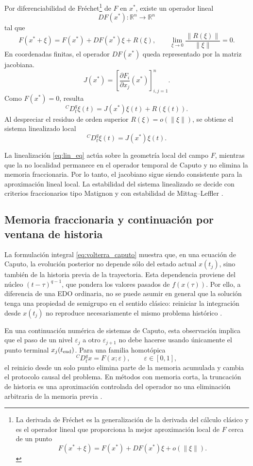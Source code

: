 \documentclass[journal]{IEEEtran}
\begin{document}
Por diferenciabilidad de Fréchet\footnote{La derivada de Fréchet es la generalización de la derivada del cálculo clásico y es el operador lineal que proporciona la mejor aproximación local de \(F\) cerca de un punto \cite{Deimling1985,Khalil2002}
\[
F(x^\ast+\xi)=F(x^\ast)+DF(x^\ast)\xi+o(\|\xi\|).
\]
} de \(F\) en \(x^\ast\), existe un operador lineal
\[
DF(x^\ast):\mathbb R^n\to\mathbb R^n
\]
tal que
\[
F(x^\ast+\xi)
=
F(x^\ast)+DF(x^\ast)\xi+R(\xi),
\qquad
\lim_{\xi\to0}\frac{\|R(\xi)\|}{\|\xi\|}=0. 
\]
En coordenadas finitas, el operador \(DF(x^\ast)\) queda representado por la matriz jacobiana.
\[
J(x^\ast)=
\left[
\frac{\partial F_i}{\partial x_j}(x^\ast)
\right]_{i,j=1}^{n}.
\]
Como \(F(x^\ast)=0\), resulta
\[
{}^{C}D_t^q \xi(t)
=
J(x^\ast)\xi(t)+R(\xi(t)).
\]
Al despreciar el residuo de orden superior \(R(\xi)=o(\|\xi\|)\), se obtiene el sistema linealizado local
\begin{equation}
\label{eq:lin_eq}
{}^{C}D_t^q \xi(t)=J(x^\ast)\xi(t).
\end{equation}

La linealización \eqref{eq:lin_eq} actúa sobre la geometría local del campo \(F\), mientras que la no localidad permanece en el operador temporal de Caputo y no elimina la memoria fraccionaria. Por lo tanto, el jacobiano sigue siendo consistente para la aproximación lineal local. La estabilidad del sistema linealizado se decide con criterios fraccionarios tipo Matignon y con estabilidad de Mittag--Leffler \cite{Matignon1996,LiMa2013,LiChenPodlubny2009}.

\subsection{Memoria fraccionaria y continuación por ventana de historia}

La formulación integral \eqref{eq:volterra_caputo} muestra que, en una ecuación de Caputo, la evolución posterior no depende sólo del estado actual \(x(t_j)\), sino también de la historia previa de la trayectoria. Esta dependencia proviene del núcleo \((t-\tau)^{q-1}\), que pondera los valores pasados de \(f(x(\tau))\). Por ello, a diferencia de una EDO ordinaria, no se puede asumir en general que la solución tenga una propiedad de semigrupo en el sentido clásico: reiniciar la integración desde \(x(t_j)\) no reproduce necesariamente el mismo problema histórico \cite{LiMa2013}.

En una continuación numérica de sistemas de Caputo, esta observación implica que el paso de un nivel \(\varepsilon_j\) a otro \(\varepsilon_{j+1}\) no debe hacerse usando únicamente el punto terminal \(x_j(t_{\rm end})\). Para una familia homotópica
\[
{}^CD_t^q x=F(x;\varepsilon),
\qquad \varepsilon\in[0,1],
\]
el reinicio desde un solo punto elimina parte de la memoria acumulada y cambia el protocolo causal del problema. En métodos con memoria corta, la truncación de historia es una aproximación controlada del operador no una eliminación arbitraria de la memoria previa \cite{Deng2007,MendesSalgadoAguirre2019,HaiYuXuRen2022}.
\end{document}

